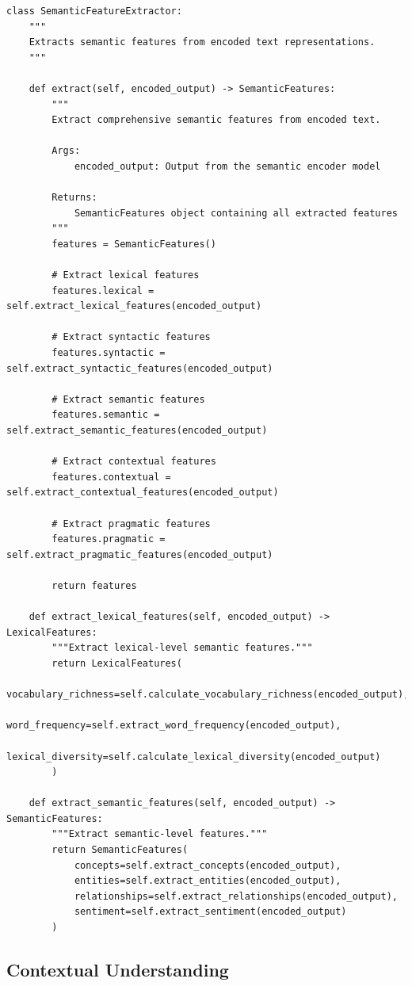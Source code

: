 \documentclass[11pt]{article}
\begin{document}
\begin{lstlisting}[style=python]
class SemanticFeatureExtractor:
    """
    Extracts semantic features from encoded text representations.
    """
    
    def extract(self, encoded_output) -> SemanticFeatures:
        """
        Extract comprehensive semantic features from encoded text.
        
        Args:
            encoded_output: Output from the semantic encoder model
            
        Returns:
            SemanticFeatures object containing all extracted features
        """
        features = SemanticFeatures()
        
        # Extract lexical features
        features.lexical = self.extract_lexical_features(encoded_output)
        
        # Extract syntactic features
        features.syntactic = self.extract_syntactic_features(encoded_output)
        
        # Extract semantic features
        features.semantic = self.extract_semantic_features(encoded_output)
        
        # Extract contextual features
        features.contextual = self.extract_contextual_features(encoded_output)
        
        # Extract pragmatic features
        features.pragmatic = self.extract_pragmatic_features(encoded_output)
        
        return features
    
    def extract_lexical_features(self, encoded_output) -> LexicalFeatures:
        """Extract lexical-level semantic features."""
        return LexicalFeatures(
            vocabulary_richness=self.calculate_vocabulary_richness(encoded_output),
            word_frequency=self.extract_word_frequency(encoded_output),
            lexical_diversity=self.calculate_lexical_diversity(encoded_output)
        )
    
    def extract_semantic_features(self, encoded_output) -> SemanticFeatures:
        """Extract semantic-level features."""
        return SemanticFeatures(
            concepts=self.extract_concepts(encoded_output),
            entities=self.extract_entities(encoded_output),
            relationships=self.extract_relationships(encoded_output),
            sentiment=self.extract_sentiment(encoded_output)
        )
\end{lstlisting}

\subsection{Contextual Understanding}
\end{document}
